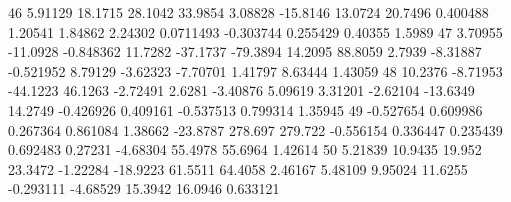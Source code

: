 46  5.91129  18.1715  28.1042  33.9854  3.08828  -15.8146  13.0724  20.7496  0.400488  1.20541  1.84862  2.24302  0.0711493  -0.303744  0.255429  0.40355  1.5989
47  3.70955  -11.0928  -0.848362  11.7282  -37.1737  -79.3894  14.2095  88.8059  2.7939  -8.31887  -0.521952  8.79129  -3.62323  -7.70701  1.41797  8.63444  1.43059
48  10.2376  -8.71953  -44.1223  46.1263  -2.72491  2.6281  -3.40876  5.09619  3.31201  -2.62104  -13.6349  14.2749  -0.426926  0.409161  -0.537513  0.799314  1.35945
49  -0.527654  0.609986  0.267364  0.861084  1.38662  -23.8787  278.697  279.722  -0.556154  0.336447  0.235439  0.692483  0.27231  -4.68304  55.4978  55.6964  1.42614
50  5.21839  10.9435  19.952  23.3472  -1.22284  -18.9223  61.5511  64.4058  2.46167  5.48109  9.95024  11.6255  -0.293111  -4.68529  15.3942  16.0946  0.633121
